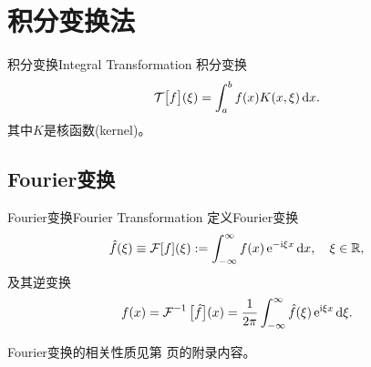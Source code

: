 \chapter{积分变换法}
\begin{definition}{积分变换}{Integral Transformation}
	积分变换
	\begin{equation}
		\label{eq:mmp-integral-transform}
		\mathcal T\bigl[f\bigr](\xi) = \int_a^bf(x)K(x,\xi)\mathop{}\!\mathrm{d} x.
	\end{equation}
	其中$K$是核函数(kernel)。
\end{definition}
\section{Fourier变换}
\setcounter{subsubsection}{1}
\begin{definition}{Fourier变换}{Fourier Transformation}
	定义Fourier变换
	\begin{equation}
		\label{eq:mmp-fourier-transform}
		\hat f(\xi) \equiv \operatorname{\mathcal{F}}[f](\xi) := \int_{-\infty}^\infty f(x)\mathop{}\!\mathrm{e}^{-\mathrm{i}\xi x}\mathop{}\!\mathrm{d} x,\quad \xi \in \mathbb{R},
	\end{equation}
	及其逆变换
	\begin{equation}
		\label{eq:mmp-inverse-fourier-transform}
		f(x) = \operatorname{\mathcal{F}}^{-1}\big[\hat f\big](x) = \frac1{2\pi}\int_{-\infty}^\infty\hat f(\xi)\mathop{}\!\mathrm{e}^{\mathrm{i}\xi x}\mathop{}\!\mathrm{d}\xi.
	\end{equation}
\end{definition}
Fourier变换的相关性质见第 \pageref{The Property of Fourier Transformation} 页的附录内容。
